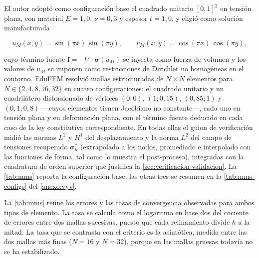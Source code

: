 El autor adoptó como configuración base el cuadrado unitario $[0,1]^2$ en tensión plana, con material $E = 1{,}0$, $\nu = 0{,}3$ y espesor $t = 1{,}0$, y eligió como solución manufacturada

\begin{equation}
u_M(x,y) = \sin(\pi x)\,\sin(\pi y), \qquad v_M(x,y) = \cos(\pi x)\,\cos(\pi y),
\label{eq:mms-solucion}
\end{equation}

cuyo término fuente $\bm{f} = -\nabla\cdot\bm{\sigma}(u_M)$ se inyecta como fuerza de volumen y los valores de $u_M$ se imponen como restricciones de Dirichlet no homogéneas en el contorno. EduFEM resolvió mallas estructuradas de $N\times N$ elementos para $N\in\{2,4,8,16,32\}$ en cuatro configuraciones: el cuadrado unitario y un cuadrilátero distorsionado de vértices $(0;0)$, $(1;0{,}15)$, $(0{,}85;1)$ y $(0{,}1;0{,}8)$ —cuyos elementos tienen Jacobiano no constante—, cada uno en tensión plana y en deformación plana, con el término fuente deducido en cada caso de la ley constitutiva correspondiente. En todas ellas el guion de verificación midió las normas $L^2$ y $H^1$ del desplazamiento y la norma $L^2$ del campo de tensiones recuperado $\bm{\sigma}^*_h$ (extrapolado a los nodos, promediado e interpolado con las funciones de forma, tal como lo muestra el post-proceso), integradas con la cuadratura de orden superior que justifica la \autoref{sec:verificacion-validacion}. La \autoref{tab:mms} reporta la configuración base; las otras tres se resumen en la \autoref{tab:mms-configs} del \autoref{anexo:vyv}.

La \autoref{tab:mms} reúne los errores y las tasas de convergencia observadas para ambos tipos de elemento. La tasa se calcula como el logaritmo en base dos del cociente de errores entre dos mallas sucesivas, puesto que cada refinamiento divide $h$ a la mitad. La tasa que se contrasta con el criterio es la asintótica, medida entre las dos mallas más finas ($N=16$ y $N=32$), porque en las mallas gruesas todavía no se ha estabilizado.

